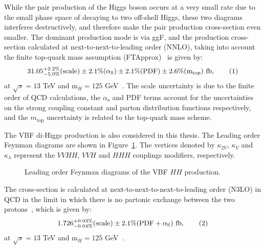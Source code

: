 While the pair production of the Higgs boson occurs at a very small rate
due to the small phase space of decaying to two off-shell Higgs, 
these two diagrams interferes destructively, and therefore make the 
pair production cross-section even smaller.
The dominant production mode is via ggF, 
and the production cross-section calculated at next-to-next-to-leading order (NNLO),
taking into account the finite top-quark mass assumption (FTApprox)~\cite{Grazzini:2018bsd}
is given by:
\[31.05^{+2.2\%}_{-5.0\%}\text{(scale)}\pm 2.1\%(\alpha_\text{S})\pm 2.1\%\text{(PDF)}\pm 2.6\%(\text{m}_\text{top})\ \text{fb},\addtag \]
at $\sqrt{s}=13$ TeV and $\text{m}_{H}=125$ GeV~\cite{dihiggs-twiki}.
The scale uncertainty is due to 
the finite order of QCD calculations, the $\alpha_\text{s}$ and PDF terms 
account for the uncertainties on the strong coupling constant 
and parton distribution functions respectively, and the 
$m_\text{top}$ uncertainty is related to the top-quark mass scheme.


The VBF di-Higgs production is also considered in this thesis. 
The Leading order Feynman diagrams are shown in Figure~\ref{fig:SM:di-Higgs-vbf}.
The vertices denoted by $\kappa_{2V}$, $\kappa_{V}$ and $\kappa_{\lambda}$
represent the $VVHH$, $VVH$ and $HHH$ couplings modifiers, respectively.
\begin{figure}[htbp]
    \centering
{} \quad
{} \quad
{} \quad
\caption{Leading order Feynman diagrams of the VBF $HH$ production. 
}
\label{fig:SM:di-Higgs-vbf}
\end{figure}
The cross-section is calculated at
next-to-next-to-next-to-leading order (N3LO) in QCD in the limit 
in which there is no partonic exchange between the two protons~\cite{Dreyer:2018qbw},
which is given by:
\[ 1.726^{+0.03\%}_{-0.04\%}\text{(scale)}\pm 2.1\%(\text{PDF}+\alpha_\text{S})~\text{fb},\addtag \]
at $\sqrt{s}=13$ TeV and $\text{m}_{H}=125$ GeV~\cite{dihiggs-twiki}.





